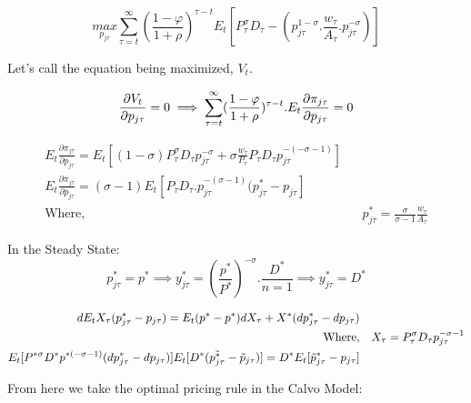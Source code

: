 \begin{equation}
     \underset{p_{j\tau}}{max} \sum_{\tau=t}^{\infty}(\frac{1-\varphi}{1+\rho})^{\tau-t}E_{t}[P_{\tau}^{\sigma}D_{\tau}-(p_{j\tau}^{1-\sigma}.\frac{w_{\tau}}{A_{\tau}}.p_{j\tau}^{-\sigma})]
\end{equation}

Let's call the equation being maximized, $V_{t}$.

\begin{equation*}
    \frac{\partial V_{t}}{\partial p_{j\tau}}=0 \\
    \implies \sum_{\tau=t}^{\infty}(\frac{1-\varphi}{1+\rho})^{\tau-t}.E_{t}\frac{\partial \pi_{j\tau}}{\partial p_{j\tau}}=0
\end{equation*}

\begin{equation*}
\begin{aligned}
    E_{t}\frac{\partial \pi_{j\tau}}{\partial p_{j\tau}}=E_{t}[(1-\sigma)P_{\tau}^{\sigma}D_{\tau}p_{j\tau}^{-\sigma}+\sigma\frac{w_{\tau}}{P_{\tau}}P_{\tau}D_{\tau}p_{j\tau}^{-(-\sigma-1)}] \\
    E_{t}\frac{\partial \pi_{j\tau}}{\partial p_{j\tau}}=(\sigma-1)E_{t}[P_{\tau}D_{\tau}.p_{j\tau}^{-(\sigma-1)}(p_{j\tau}^{*}-p_{j\tau}] \\
    \text{Where,} && p_{j\tau}^{*}=\frac{\sigma}{\sigma-1}\frac{w_{\tau}}{A_{\tau}}
\end{aligned}
\end{equation*}

In the Steady State: 
\begin{equation*}
    p_{j\tau}^{*}=p^{*} \implies y_{j\tau}^{*}=(\frac{p^{*}}{P^{*}})^{-\sigma}.\frac{D^{*}}{n=1} \implies y_{j\tau}^{*}=D^{*}
\end{equation*}
    
\begin{equation*}
\begin{aligned}
    dE_{t}X_{\tau}(p_{j\tau}^{*}-p_{j\tau})=E_{t}(p^{*}-p^{*})dX_{\tau}+X^{*}(dp_{j\tau}^{*}-dp_{j\tau}) \\
    \text{Where,} && X_{\tau}=P_{\tau}^{\sigma}D_{\tau}p_{j\tau}^{-\sigma-1} \\
    E_{t}[P^{*\sigma}D^{*}p^{*(-\sigma-1)}(dp_{j\tau}^{*}-dp_{j\tau})]E_{t}[D^{*}(\Tilde{p_{j\tau}^{*}}-\Tilde{p}_{j\tau})]=D^{*}E_{t}[\Tilde{p}_{j\tau}^{*}-p_{j\tau}]
\end{aligned}
\end{equation*}

From here we take the optimal pricing rule in the Calvo Model:

